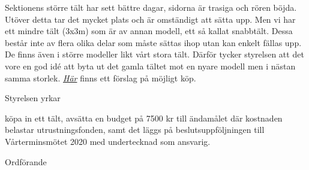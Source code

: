 \documentclass[../_main/handlingar.tex]{subfiles}
\begin{document}

Sektionens större tält har sett bättre dagar, sidorna är trasiga och rören böjda. Utöver detta tar det mycket plats och är omständigt att sätta upp. Men vi har ett mindre tält (3x3m) som är av annan modell, ett så kallat snabbtält. Dessa består inte av flera olika delar som måste sättas ihop utan kan enkelt fällas upp. De finns även i större modeller likt vårt stora tält. Därför tycker styrelsen att det vore en god idé att byta ut det gamla tältet mot en nyare modell men i nästan samma storlek. \href{https://www.taltpartner.se/Snabbtalt/578849.html?force_sid=o0hih3tdih7s6c8co0k3qktive}{\textit{Här}} finns ett förslag på möjligt köp. 

Styrelsen yrkar

\begin{attsatser}
    \att köpa in ett tält, 
    \att avsätta en budget på 7500 kr till ändamålet där kostnaden belastar utrustningsfonden, samt 
    \att det läggs på beslutsuppföljningen till Vårterminsmötet 2020 med undertecknad som ansvarig.


\end{attsatser}

\begin{signatures}{1}
    \ist
    \signature{\ordf}{Ordförande}
\end{signatures}
\end{document}
